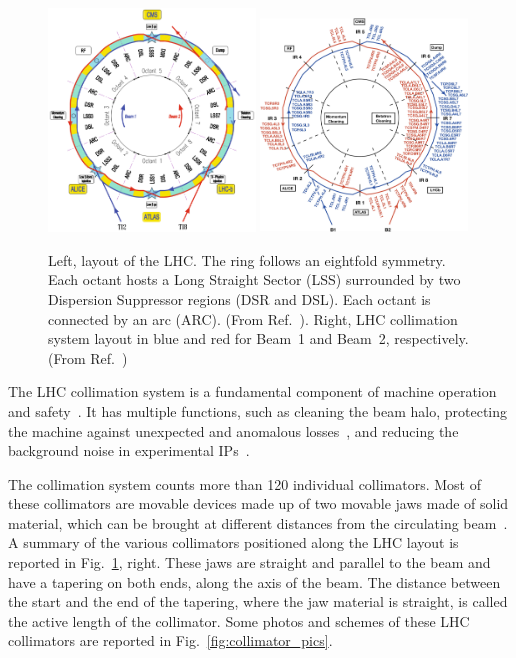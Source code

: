 \begin{figure}[hpt]
    \centering
    \includegraphics[width=0.49\textwidth]{5_Diffusion_measurement_LHC/figs/layout.png}
    \includegraphics[width=0.49\textwidth]{5_Diffusion_measurement_LHC/figs/coll_scheme.png}
    \caption{Left, layout of the LHC. The ring follows an eightfold symmetry. Each octant hosts a Long Straight Sector (LSS) surrounded by two Dispersion Suppressor regions (DSR and DSL). Each octant is connected by an arc (ARC). (From Ref.~\cite{Bruning:782076}). Right, LHC collimation system layout in blue and red for Beam~1 and Beam~2, respectively. (From Ref.~\cite{azzopardi:crosstalk})}
    \label{fig:lhc_layout}
\end{figure}

The LHC collimation system is a fundamental component of machine operation and safety~\cite{1590664, Assmann:972336}. It has multiple functions, such as cleaning the beam halo, protecting the machine against unexpected and anomalous losses~\cite{BRUCE201719}, and reducing the background noise in experimental IPs~\cite{Bruce:1646958, Bruce:2686581}.

The collimation system counts more than 120 individual collimators. Most of these collimators are movable devices made up of two movable jaws made of solid material, which can be brought at different distances from the circulating beam~\cite{Bertarelli:794628}. A summary of the various collimators positioned along the LHC layout is reported in Fig.~\ref{fig:lhc_layout}, right. These jaws are straight and parallel to the beam and have a tapering on both ends, along the axis of the beam. The distance between the start and the end of the tapering, where the jaw material is straight, is called the active length of the collimator. Some photos and schemes of these LHC collimators are reported in Fig.~\ref{fig:collimator_pics}.


